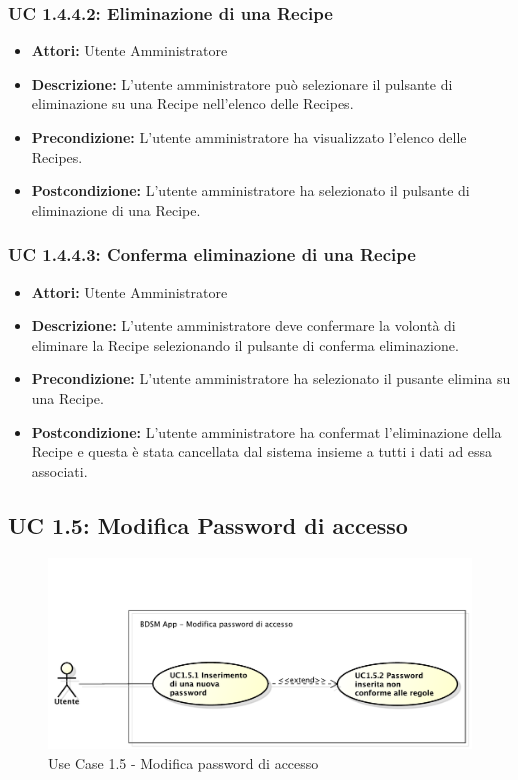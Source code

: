 \subsubsection{UC 1.4.4.2: Eliminazione di una Recipe}

\begin{itemize}
    \item \textbf{Attori:} Utente Amministratore
    \item \textbf{Descrizione:} L'utente amministratore può selezionare il pulsante di eliminazione su una Recipe nell'elenco delle Recipes.
    \item \textbf{Precondizione:} L'utente amministratore ha visualizzato l'elenco delle Recipes.
    \item \textbf{Postcondizione:} L'utente amministratore ha selezionato il pulsante di eliminazione di una Recipe.
\end{itemize}
\subsubsection{UC 1.4.4.3: Conferma eliminazione di una Recipe}

\begin{itemize}
    \item \textbf{Attori:} Utente Amministratore
    \item \textbf{Descrizione:} L'utente amministratore deve confermare la volontà di eliminare la Recipe selezionando il pulsante di conferma eliminazione.
    \item \textbf{Precondizione:} L'utente amministratore ha selezionato il pusante elimina su una Recipe.
    \item \textbf{Postcondizione:} L'utente amministratore ha confermat l'eliminazione della Recipe e questa è stata cancellata dal sistema insieme a tutti i dati ad essa associati.
\end{itemize}



\subsection{UC 1.5: Modifica Password di accesso}

\begin{figure}[htbp]
    \centering
    \centerline{\includegraphics[scale=0.5]{./images/UC1_5.pdf}}
    \caption{Use Case 1.5 - Modifica password di accesso}
\end{figure}

